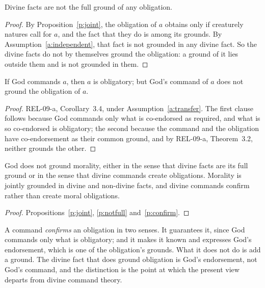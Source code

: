 \documentclass{situationist-preprint}
\begin{document}
\begin{proposition}\label{p:notfull}
Divine facts are not the full ground of any obligation.
\end{proposition}

\begin{proof}
By Proposition~\ref{p:joint}, the obligation of $a$ obtains only if creaturely natures call for $a$, and the fact that they do is among its grounds. By Assumption~\ref{a:independent}, that fact is not grounded in any divine fact. So the divine facts do not by themselves ground the obligation: a ground of it lies outside them and is not grounded in them.
\end{proof}

\begin{proposition}\label{p:confirm}
If God commands $a$, then $a$ is obligatory; but God's command of $a$ does not ground the obligation of $a$.
\end{proposition}

\begin{proof}
REL-09-a, Corollary~3.4, under Assumption~\ref{a:transfer}. The first clause follows because God commands only what is co-endorsed as required, and what is so co-endorsed is obligatory; the second because the command and the obligation have co-endorsement as their common ground, and by REL-09-a, Theorem~3.2, neither grounds the other.
\end{proof}

\begin{theorem}\label{t:main}
God does not ground morality, either in the sense that divine facts are its full ground or in the sense that divine commands create obligations. Morality is jointly grounded in divine and non-divine facts, and divine commands confirm rather than create moral obligations.
\end{theorem}

\begin{proof}
Propositions~\ref{p:joint}, \ref{p:notfull} and~\ref{p:confirm}.
\end{proof}

A command \emph{confirms} an obligation in two senses. It guarantees it, since God commands only what is obligatory; and it makes it known and expresses God's endorsement, which is one of the obligation's grounds. What it does not do is add a ground. The divine fact that does ground obligation is God's endorsement, not God's command, and the distinction is the point at which the present view departs from divine command theory.
\end{document}

